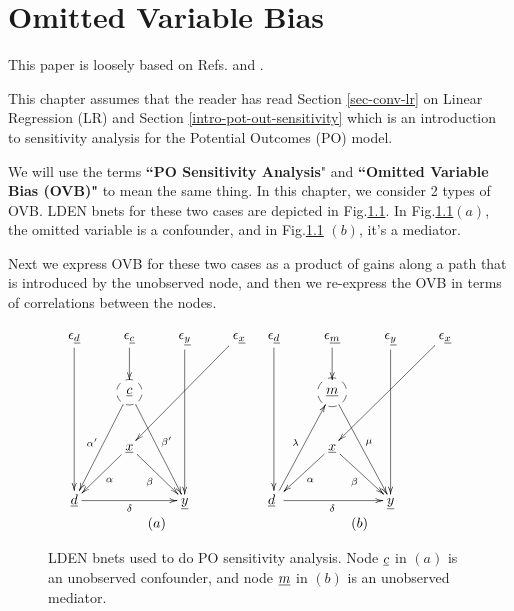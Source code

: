 \chapter{Omitted Variable Bias}
\label{ch-omitted-var-bias}

This paper is
loosely based on Refs.\cite{cinelli-haz}
and \cite{cherno-cinelli}.

This chapter assumes that the
reader has read Section 
\ref{sec-conv-lr}
on Linear Regression (LR)
and Section \ref{intro-pot-out-sensitivity}
which is an introduction
to sensitivity analysis
for the Potential Outcomes (PO)
model.

We will
 use the terms {\bf ``PO Sensitivity Analysis}"
and {\bf ``Omitted Variable Bias (OVB)"}
to mean the same thing.
In this chapter,
we consider 2 types 
of OVB. LDEN bnets for
these two cases are depicted in Fig.\ref{fig-ovb-two-lden}.
In Fig.\ref{fig-ovb-two-lden}$(a)$, the omitted variable
is a confounder,
and in Fig.\ref{fig-ovb-two-lden} $(b)$,
it's a mediator.

Next we express OVB for these two cases as
a product of gains along a path
that is introduced by the unobserved node, and then we re-express the OVB 
in terms of correlations between the nodes.
 


\begin{figure}[h!]
$$
\begin{array}{cc}
\xymatrix{
\eps_\rvd\ar[ddd]
&\eps_\rvc\ar[d]
&\eps_\rvy\ar[ddd]
&\eps_\rvx\ar[ddll]
\\
&*++[F-o]{\rvc}\ar[ldd]_{\alp'}
\ar[rdd]^{\beta'}
\\
&\rvx
\ar[ld]^\alp
\ar[rd]_\beta
\\
\rvd\ar[rr]_\delta
&&\rvy
}
&
\xymatrix{
\eps_\rvd\ar[ddd]
&\eps_\rvm\ar[d]
&\eps_\rvy\ar[ddd]
&\eps_\rvx\ar[ddll]
\\
&*++[F-o]{\rvm}
\ar[rdd]^{\mu}
\\
&\rvx
\ar[ld]^\alp
\ar[rd]_\beta
\\
\rvd\ar[rr]_\delta
\
\ar[ruu]^\lam
&&\rvy
}
\\
(a)&(b)
\end{array}
$$
\caption{LDEN bnets used to do PO
sensitivity analysis.
Node ${\underline{c}}$ in $(a)$
is an unobserved confounder,
and node ${\underline{m}}$ in $(b)$
is an unobserved mediator.}
\label{fig-ovb-two-lden}
\end{figure}







